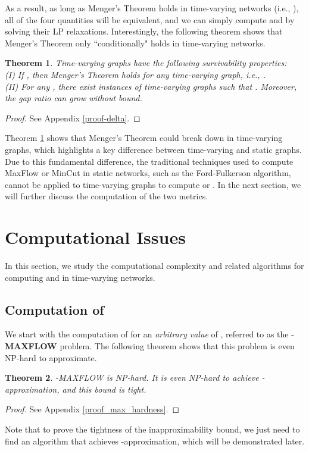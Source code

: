 \documentclass[10pt, conference, letterpaper]{IEEEtran}
\newtheorem{theorem}{Theorem}
\begin{document}
As a result, as long as Menger's Theorem holds in time-varying networks (i.e., ), all of the four quantities will be equivalent, and we can simply compute  and  by solving their LP relaxations. Interestingly, the following theorem shows that Menger's Theorem only ``conditionally" holds in time-varying networks.

\begin{theorem}\label{delta}
Time-varying graphs have the following survivability properties:\\
(I) If , then Menger's Theorem holds for any time-varying graph, i.e., .\\
(II) For any , there exist instances of time-varying graphs such that . Moreover, the gap ratio  can grow without bound.
\end{theorem}
\begin{proof}
See Appendix \ref{proof-delta}.
\end{proof}
Theorem \ref{delta} shows that Menger's Theorem could break down in time-varying graphs, which highlights a key difference between time-varying and static graphs. Due to this fundamental difference, the traditional techniques used to compute MaxFlow or MinCut in static networks, such as the Ford-Fulkerson algorithm, cannot be applied to time-varying graphs to compute  or . In the next section, we will further discuss the computation of the two metrics.

\section{Computational Issues}\label{comp}
In this section, we study the computational complexity and related algorithms for computing  and  in time-varying networks. \subsection{Computation of { }}\label{com_maxflow}
We start with the computation of   for an \emph{arbitrary value} of , referred to as the -\textbf{MAXFLOW} problem.
The following theorem shows that this problem is even NP-hard to approximate.
\begin{theorem}\label{max_hardness}
-MAXFLOW is NP-hard. It is even NP-hard to achieve -approximation, and this bound is tight.
\end{theorem}
\begin{proof}
See Appendix \ref{proof_max_hardness}.
\end{proof}
\noindent Note that to prove the tightness of the inapproximability bound, we just need to find an algorithm that achieves -approximation, which will be demonstrated later.
\end{document}
